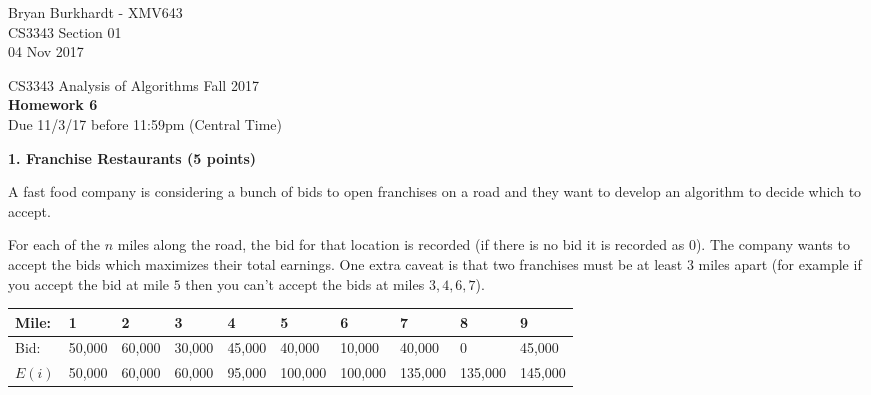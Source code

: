 \documentclass[12pt]{elsart}
\begin{document}
Bryan Burkhardt - XMV643\\
CS3343 Section 01\\
04 Nov 2017\\

\pagestyle{empty}

\begin{center}
\Large  CS3343 Analysis of Algorithms Fall 2017 \\
\large {\bf Homework 6}\\
\normalsize Due 11/3/17 before 11:59pm (Central Time)
\end{center}

{\bf 1.  Franchise Restaurants (5 points)}

A fast food company is considering a bunch of bids to open franchises on a road and they want to develop an algorithm to decide which to accept.

For each of the $n$ miles along the road, the bid for that location is recorded (if there is no bid it is recorded as $0$).  The company wants to accept the bids which maximizes their total earnings.  One extra caveat is that two franchises must be at least $3$ miles apart (for example if you accept the bid at mile $5$ then you can't accept the bids at miles $3,4,6,7$).

\hspace*{0.5cm}  \begin{tabular}{ |l|l|l|l|l|l|l|l|l|l| }
  \hline
   Mile: & 1 & 2 & 3 & 4 & 5 & 6 & 7 & 8 & 9 \\
  \hline
  Bid: &   50,000 & 60,000 & 30,000 & 45,000 & 40,000 & 10,000 & 40,000 & 0 & 45,000 \\
  \hline
$E(i)$ & 50,000 & 60,000 & 60,000 & 95,000 & 100,000 & 100,000 & 135,000 & 135,000 & 145,000 \\
  \hline
\end{tabular}
\end{document}
